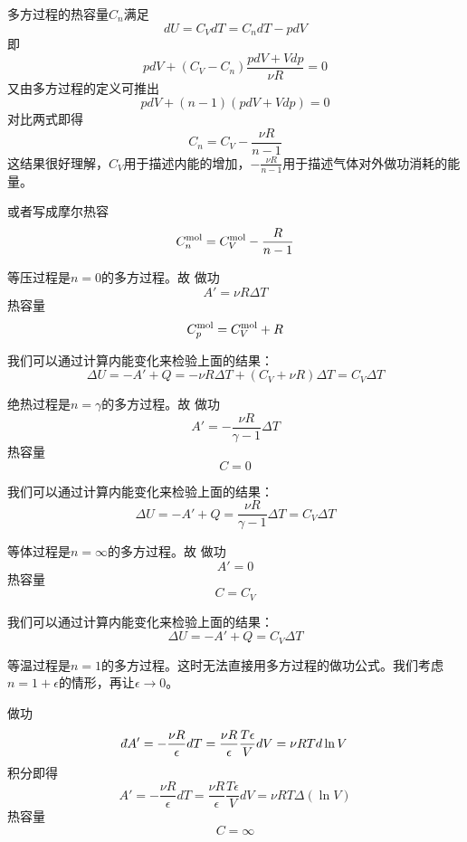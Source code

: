\documentclass[CJK]{beamer}
\begin{document}
\begin{frame}
\bch
{\small
多方过程的热容量$C_n$满足
$$dU = C_VdT = C_n dT - pdV$$
即
$$pdV + (C_V - C_n) \frac{pdV+Vdp}{\nu R} = 0$$
又由多方过程的定义可推出
$$pdV + (n-1)(pdV + Vdp) = 0$$
对比两式即得
{\blue
$$C_n = C_V - \frac{\nu R}{n-1}$$
}
这结果很好理解，$C_V$用于描述内能的增加，$- \frac{\nu R}{n-1}$用于描述气体对外做功消耗的能量。

或者写成摩尔热容
$$C_n^{\rm mol} = C_V^{\rm mol} - \frac{R}{n-1}$$
}
\ech
\end{frame}


\begin{frame}
\bch
\bex
等压过程是$n=0$的多方过程。故
做功
$$A' = \nu R\Delta T $$
热容量
$$C_p^{\rm mol} = C_V^{\rm mol}+ R $$

\skipline

我们可以通过计算内能变化来检验上面的结果：
$$ \Delta U = -A' + Q = -\nu R\Delta T +(C_V + \nu R)\Delta T =  C_V\Delta T$$

\eex
\ech
\end{frame}

\begin{frame}
\bch
\bex
绝热过程是$n=\gamma$的多方过程。故
做功
$$A' = -\frac{\nu R}{\gamma-1}\Delta T$$
热容量
$$C = 0 $$

我们可以通过计算内能变化来检验上面的结果：
$$ \Delta U = -A' + Q = \frac{\nu R}{\gamma-1} \Delta T  =  C_V\Delta T$$

\eex
\ech
\end{frame}

\begin{frame}
\bch
\bex
等体过程是$n=\infty$的多方过程。故
做功
$$A' = 0$$
热容量
$$C = C_V $$

我们可以通过计算内能变化来检验上面的结果：
$$ \Delta U = -A' + Q =  C_V\Delta T$$

\eex
\ech
\end{frame}


\begin{frame}
\bch
\bex
等温过程是$n=1$的多方过程。这时无法直接用多方过程的做功公式。我们考虑$n=1+\epsilon$的情形，再让$\epsilon \rightarrow 0$。

做功
$$\dbar A' = -\frac{\nu R}{\epsilon}dT = \frac{\nu R}{\epsilon}\frac{T\epsilon}{V}dV = \nu RT d\ln V $$
积分即得
$$ A' = -\frac{\nu R}{\epsilon}dT = \frac{\nu R}{\epsilon}\frac{T\epsilon}{V}dV = \nu RT \Delta(\ln V) $$
热容量
$$C = \infty $$

\eex
\ech
\end{frame}
\end{document}
